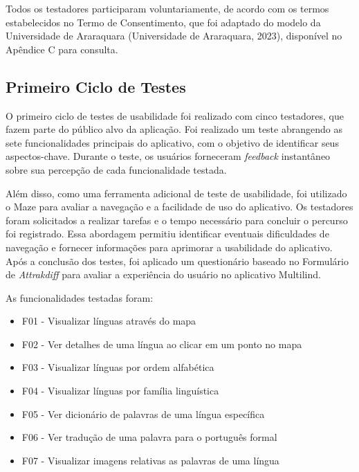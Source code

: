 Todos os testadores participaram voluntariamente, de acordo com os termos estabelecidos no Termo de Consentimento, que foi adaptado do 
modelo da Universidade de Araraquara (Universidade de Araraquara, 2023), disponível no Apêndice C para consulta.

\subsection{Primeiro Ciclo de Testes}
\label{sec:Primeiro Ciclo}
O primeiro ciclo de testes de usabilidade foi realizado com cinco testadores, que fazem parte do público alvo da aplicação. Foi realizado um teste abrangendo as sete funcionalidades 
principais do aplicativo, com o objetivo de identificar seus aspectos-chave. Durante o teste, os usuários forneceram \textit{feedback} instantâneo sobre sua percepção de cada funcionalidade testada. 

Além disso, como uma ferramenta adicional de teste de usabilidade, foi utilizado o Maze para avaliar a navegação e a facilidade de uso do aplicativo. Os testadores foram solicitados a realizar  
tarefas e o tempo necessário para concluir o percurso foi registrado. Essa abordagem permitiu identificar eventuais dificuldades de navegação e fornecer informações para aprimorar a usabilidade do aplicativo.
Após a conclusão dos testes, foi aplicado um questionário baseado no Formulário de \textit{Attrakdiff} para avaliar a experiência do usuário no aplicativo Multilind.

\begin{description}
    \item As funcionalidades testadas foram:
	\begin{itemize}
		\item F01 - Visualizar línguas através do mapa
		\item F02 - Ver detalhes de uma língua ao clicar em um ponto no mapa
		\item F03 - Visualizar línguas por ordem alfabética
		\item F04 - Visualizar línguas por família linguística
		\item F05 - Ver dicionário de palavras de uma língua específica
		\item F06 - Ver tradução de uma palavra para o português formal
		\item F07 - Visualizar imagens relativas as palavras de uma língua
	\end{itemize}
\end{description}


